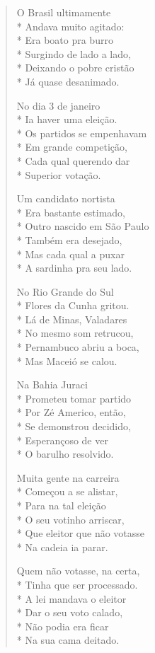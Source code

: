 \begin{verse}
O Brasil ultimamente\\*
Andava muito agitado:\\*
Era boato pra burro\\*
Surgindo de lado a lado,\\*
Deixando o pobre cristão\\*
Já quase desanimado.

No dia 3 de janeiro\\*
Ia haver uma eleição.\\*
Os partidos se empenhavam\\*
Em grande competição,\\*
Cada qual querendo dar\\*
Superior votação.

Um candidato nortista\\*
Era bastante estimado,\\*
Outro nascido em São Paulo\\*
Também era desejado,\\*
Mas cada qual a puxar\\*
A sardinha pra seu lado.

No Rio Grande do Sul\\*
Flores da Cunha gritou.\\*
Lá de Minas, Valadares\\*
No mesmo som retrucou,\\*
Pernambuco abriu a boca,\\*
Mas Maceió se calou.

Na Bahia Juraci\\*
Prometeu tomar partido\\*
Por Zé Americo, então,\\*
Se demonstrou decidido,\\*
Esperançoso de ver\\*
O barulho resolvido.

Muita gente na carreira\\*
Começou a se alistar,\\*
Para na tal eleição\\*
O seu votinho arriscar,\\*
Que eleitor que não votasse\\*
Na cadeia ia parar.

Quem não votasse, na certa, \\*
Tinha que ser processado.\\*
A lei mandava o eleitor\\*
Dar o seu voto calado,\\*
Não podia era ficar\\*
Na sua cama deitado.


\end{verse}
